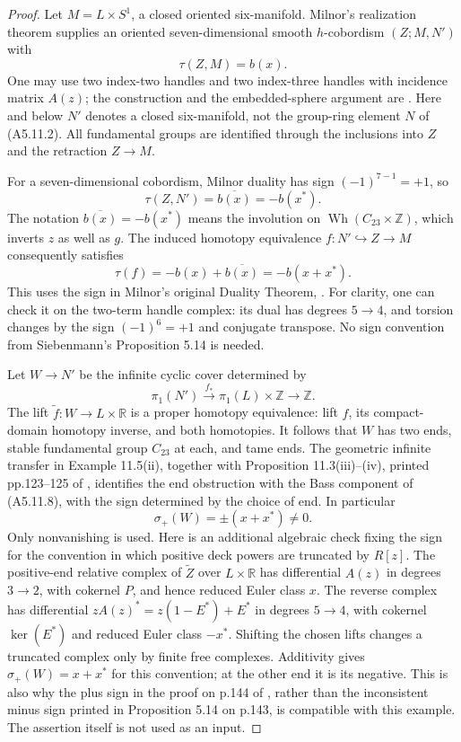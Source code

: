 \begin{proof}
Let $M=L\times S^1$, a closed oriented six-manifold.
Milnor's realization theorem supplies an oriented seven-dimensional
smooth $h$-cobordism $(Z;M,N')$ with
\[
 \tau(Z,M)=b(x).                                         \tag{A5.11.7}
\]
One may use two index-two handles and two index-three handles with
incidence matrix $A(z)$; the construction and the embedded-sphere
argument are \cite[\S11, Existence Theorem 11.1 and Lemma 11.2,
pp.398--399]{A5-Milnor1966}.  Here and below $N'$ denotes a closed
six-manifold, not the group-ring element $N$ of (A5.11.2).
All fundamental groups are identified through the inclusions into
$Z$ and the retraction $Z\to M$.

For a seven-dimensional cobordism, Milnor duality has sign
$(-1)^{7-1}=+1$, so
\[
 \tau(Z,N')=\overline{b(x)}=-b(x^*).
\]
The notation $\overline{b(x)}=-b(x^*)$ means the involution on
$\operatorname{Wh}(C_{23}\times\mathbb Z)$, which inverts $z$ as
well as $g$.  The induced homotopy equivalence
$f:N'\hookrightarrow Z\to M$ consequently satisfies
\[
 \tau(f)=-b(x)+\overline{b(x)}=-b(x+x^*).                 \tag{A5.11.8}
\]
This uses the sign in Milnor's original Duality Theorem,
\cite[\S10, p.394, proof pp.395--397]{A5-Milnor1966}.
For clarity, one can check it on the two-term handle complex:
its dual has degrees $5\to4$, and torsion changes by the sign
$(-1)^6=+1$ and conjugate transpose.  No sign convention from
Siebenmann's Proposition 5.14 is needed.

Let $W\to N'$ be the infinite cyclic cover determined by
\[
 \pi_1(N')\xrightarrow{f_*}\pi_1(L)\times\mathbb Z
                       \longrightarrow\mathbb Z.
\]
The lift $\widetilde f:W\to L\times\mathbb R$ is a proper
homotopy equivalence: lift $f$, its compact-domain homotopy inverse,
and both homotopies.  It follows that $W$ has two ends, stable
fundamental group $C_{23}$ at each, and tame ends.  The geometric
infinite transfer in Example 11.5(ii), together with
Proposition 11.3(iii)--(iv), printed pp.123--125 of
\cite{A5-HughesRanicki1996}, identifies the end obstruction with
the Bass component of (A5.11.8), with the sign determined by the
choice of end.  In particular
\[
                  \sigma_+(W)=\pm(x+x^*)\ne0.           \tag{A5.11.9}
\]
Only nonvanishing is used.  Here is an additional algebraic check
fixing the sign for the convention in which positive deck powers
are truncated by $R[z]$.  The positive-end relative complex of
$\widetilde Z$ over $L\times\mathbb R$ has differential $A(z)$
in degrees $3\to2$, with cokernel $P$, and hence reduced Euler
class $x$.  The reverse complex has differential
$zA(z)^*=z(1-E^*)+E^*$ in degrees $5\to4$, with cokernel
$\ker(E^*)$ and reduced Euler class $-x^*$.  Shifting the chosen
lifts changes a truncated complex only by finite free complexes.
Additivity gives $\sigma_+(W)=x+x^*$ for this convention; at
the other end it is its negative.  This is also why the plus sign
in the proof on p.144 of \cite{A5-Siebenmann1972}, rather than
the inconsistent minus sign printed in Proposition 5.14 on p.143,
is compatible with this example.  The assertion itself is not
used as an input.


\end{proof}
